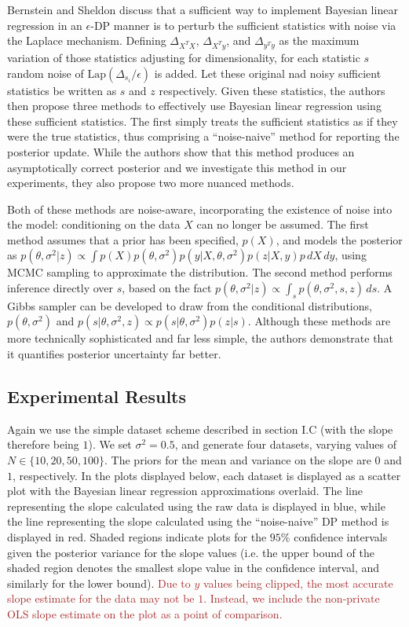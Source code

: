 \documentclass[11pt,conference]{IEEEtran}
\begin{document}
Bernstein and Sheldon discuss that a sufficient way to implement Bayesian linear regression in an $\epsilon$-DP manner is to perturb the sufficient statistics with noise via the Laplace mechanism. Defining $\Delta_{X^T X}$, $\Delta_{X^T y}$, and $\Delta_{y^T y}$ as the maximum variation of those statistics adjusting for dimensionality, for each statistic $s$ random noise of $\textrm{Lap}(\Delta_{s_i}/\epsilon)$ is added. Let these original nad noisy sufficient statistics be written as $s$ and $z$ respectively. Given these statistics, the authors then propose three methods to effectively use Bayesian linear regression using these sufficient statistics. The first simply treats the sufficient statistics as if they were the true statistics, thus comprising a ``noise-naive'' method for reporting the posterior update. While the authors show that this method produces an asymptotically correct posterior and we investigate this method in our experiments, they also propose two more nuanced methods.

Both of these methods are noise-aware, incorporating the existence of noise into the model: conditioning on the data $X$ can no longer be assumed. The first method assumes that a prior has been specified, $p(X)$, and models the posterior as $p(\theta, \sigma^2|z)\propto \int p(X)p(\theta, \sigma^2)p(y|X,\theta, \sigma^2)p(z|X,y)p\, dX\, dy$, using MCMC sampling to approximate the distribution. The second method performs inference directly over $s$, based on the fact $p(\theta, \sigma^2|z)\propto \int_s p(\theta, \sigma^2,s,z)\, ds$. A Gibbs sampler can be developed to draw from the conditional distributions, $p(\theta, \sigma^2)$ and $p(s|\theta, \sigma^2, z)\propto p(s|\theta, \sigma^2)p(z|s)$. Although these methods are more technically sophisticated and far less simple, the authors demonstrate that it quantifies posterior uncertainty far better.

\subsection{Experimental Results}
Again we use the simple dataset scheme described in section I.C (with the slope therefore being $1$). We set $\sigma^2=0.5$, and generate four datasets, varying values of $N\in\{10,20,50,100\}$. The priors for the mean and variance on the slope are $0$ and $1$, respectively. In the plots displayed below, each dataset is displayed as a scatter plot with the Bayesian linear regression approximations overlaid. The line representing the slope calculated using the raw data is displayed in blue, while the line representing the slope calculated using the ``noise-naive'' DP method is displayed in red. Shaded regions indicate plots for the $95\%$ confidence intervals given the posterior variance for the slope values (i.e. the upper bound of the shaded region denotes the smallest slope value in the confidence interval, and similarly for the lower bound). \textcolor{brown}{Due to $y$ values being clipped, the most accurate slope estimate for the data may not be $1$. Instead, we include the non-private OLS slope estimate on the plot as a point of comparison.}
\end{document}

